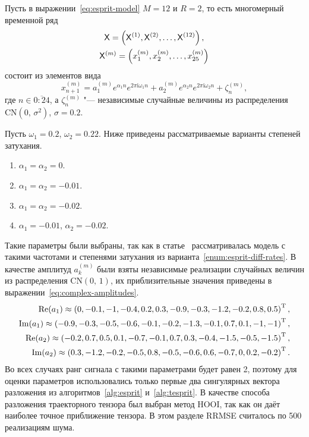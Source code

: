 \documentclass[specialist,
  substylefile = spbu.rtx,
subf,href,colorlinks=true, 12pt]{disser}
\theoremstyle{plain}
\theoremstyle{definition}
\theoremstyle{remark}
\newcommand{\iu}{\mathrm{i}}
\begin{document}
Пусть в выражении~\eqref{eq:esprit-model} $M=12$ и $R=2$, то
есть многомерный временной ряд
\begin{gather*}
  \mathsf{X} = \left(\mathsf{X}^{(1)}, \mathsf{X}^{(2)}, \ldots, \mathsf{X}^{(12)}\right),\\
  \mathsf{X}^{(m)} = \left(x_1^{(m)}, x_2^{(m)}, \ldots, x_{25}^{(m)}\right)
\end{gather*}
состоит из элементов вида
\[
  x_{n + 1}^{(m)} = a_1^{(m)} e^{ \alpha_1 n }
  e^{2 \pi \iu \omega_1 n} +
  a_2^{(m)} e^{ \alpha_2 n }
  e^{2 \pi \iu \omega_2 n} + \zeta_n^{(m)},
\]
где $n \in \overline{0:24}$, а $\zeta_n^{(m)}$ "--- независимые
случайные величины из
распределения $\mathrm{CN}(0,\, \sigma^2)$, $\sigma=0.2$.

Пусть $\omega_1 = 0.2$, $\omega_2 = 0.22$.
Ниже приведены рассматриваемые варианты степеней затухания.
\begin{enumerate}
  \item\label{enum:esprit-no-rates} $\alpha_1=\alpha_2=0$.
  \item\label{enum:esprit-smalleq-rates} $\alpha_1=\alpha_2=-0.01$.
  \item\label{enum:esprit-bigeq-rates} $\alpha_1=\alpha_2=-0.02$.
  \item\label{enum:esprit-diff-rates} $\alpha_1= -0.01$, $\alpha_2=-0.02$.
\end{enumerate}
Такие параметры были выбраны, так как в статье~\cite{hosvd-hooi-separation}
рассматривалась модель с такими частотами и степенями затухания из
варианта~\ref{enum:esprit-diff-rates}.
В качестве амплитуд $a_k^{(m)}$ были взяты независимые реализации
случайных величин из распределения $\mathrm{CN}(0,\, 1)$,
их приблизительные значения приведены в
выражении~\eqref{eq:complex-amplitudes}.
\begin{gather}
  \label{eq:complex-amplitudes}
  \begin{split}
    \operatorname{Re}(a_1) \approx \left( 0, -0.1, -1, -0.4, 0.2,
    0.3, -0.9, -0.3, -1.2, -0.2, 0.8, 0.5\right)^{\mathrm{T}}, \\
    \operatorname{Im}(a_1) \approx \left(-0.9, -0.3, -0.5, -0.6,
    -0.1, -0.2, -1.3, -0.1, 0.7, 0.1, -1, -1 \right)^{\mathrm{T}}, \\
    \operatorname{Re}(a_2) \approx \left( -0.2, 0.7, 0.5, 0.1, -0.7,
    -0.1, 0.7, 0.3, -0.4, -1.5, -0.5, -1.5\right)^{\mathrm{T}}, \\
    \operatorname{Im}(a_2) \approx \left( 0.3, -1.2, -0.2, -0.5, 0.8,
    -0.5, -0.6, 0.6, -0.7, 0, 0.2, -0.2\right)^{\mathrm{T}}. \\
  \end{split}
\end{gather}
Во всех случаях ранг сигнала с такими параметрами будет равен 2,
поэтому для оценки параметров
использовались только первые два сингулярных вектора разложения из
алгоритмов~\ref{alg:esprit}
и~\ref{alg:tesprit}.
В качестве способа разложения траекторного тензора был выбран
метод HOOI, так как он даёт наиболее точное приближение
тензора.
В этом разделе RRMSE считалось по 500 реализациям шума.
\end{document}
